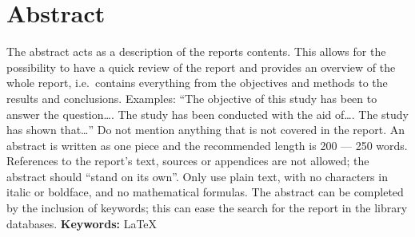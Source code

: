 \section*{Abstract}\label{sec:abstract}
The abstract acts as a description of the reports contents. This allows for the
possibility to have a quick review of the report and provides an overview of the
whole report, i.e.\ contains everything from the objectives and methods to the
results and conclusions. Examples: “The objective of this study has been to
answer the question…. The study has been conducted with the aid of…. The study
has shown that…” Do not mention anything that is not covered in the report. An
abstract is written as one piece and the recommended length is 200 --- 250 words.
References to the report's text, sources or appendices are not allowed; the
abstract should “stand on its own”. Only use plain text, with no characters in
italic or boldface, and no mathematical formulas. The abstract can be completed
by the inclusion of keywords; this can ease the search for the report in the
library databases.
\textbf{Keywords:} LaTeX 
